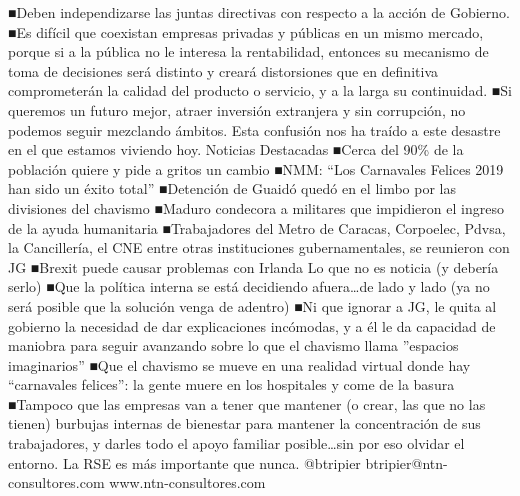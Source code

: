 \documentclass{article}%
\begin{document}
\newline%
%
■Deben independizarse las juntas directivas con respecto a la acción de Gobierno.%
\newline%
%
■Es difícil que coexistan empresas privadas y públicas en un mismo mercado, porque si a la pública no le interesa la rentabilidad, entonces su mecanismo de toma de decisiones será distinto y creará distorsiones que en definitiva comprometerán la calidad del producto o servicio, y a la larga su continuidad.%
\newline%
%
■Si queremos un futuro mejor, atraer inversión extranjera y sin corrupción, no podemos seguir mezclando ámbitos. Esta confusión nos ha traído a este desastre en el que estamos viviendo hoy.%
\newline%
%
Noticias Destacadas%
\newline%
%
■Cerca del 90\% de la población quiere y pide a gritos un cambio%
\newline%
%
■NMM: “Los Carnavales Felices 2019 han sido un éxito total”%
\newline%
%
■Detención de Guaidó quedó en el limbo por las divisiones del chavismo%
\newline%
%
■Maduro condecora a militares que impidieron el ingreso de la ayuda humanitaria%
\newline%
%
■Trabajadores del Metro de Caracas, Corpoelec, Pdvsa, la Cancillería, el CNE entre otras instituciones gubernamentales, se reunieron con JG%
\newline%
%
■Brexit puede causar problemas con Irlanda%
\newline%
%
Lo que no es noticia (y debería serlo)%
\newline%
%
■Que la política interna se está decidiendo afuera…de lado y lado (ya no será posible que la solución venga de adentro)%
\newline%
%
■Ni que ignorar a JG, le quita al gobierno la necesidad de dar explicaciones incómodas, y a él le da capacidad de maniobra para seguir avanzando sobre lo que el chavismo llama ”espacios imaginarios”%
\newline%
%
■Que el chavismo se mueve en una realidad virtual donde hay “carnavales felices”: la gente muere en los hospitales y come de la basura%
\newline%
%
■Tampoco que las empresas van a tener que mantener (o crear, las que no las tienen) burbujas internas de bienestar para mantener la concentración de sus trabajadores, y darles todo el apoyo familiar posible…sin por eso olvidar el entorno. La RSE es más importante que nunca.%
\newline%
%
@btripier%
\newline%
%
btripier@ntn{-}consultores.com%
\newline%
%
www.ntn{-}consultores.com%
\newline%
%
\end{document}
